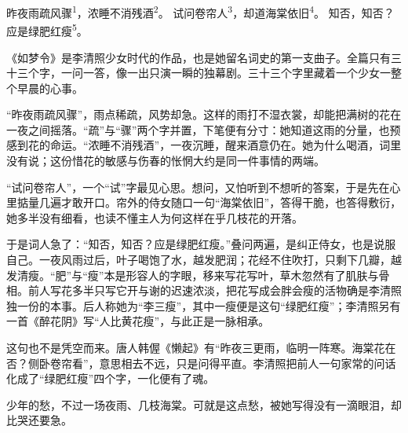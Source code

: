 
\begin{poem}
昨夜雨疏风骤\textsuperscript{1}，浓睡不消残酒\textsuperscript{2}。
试问卷帘人\textsuperscript{3}，却道海棠依旧\textsuperscript{4}。
知否，知否？应是绿肥红瘦\textsuperscript{5}。
\end{poem}

\begin{annotations}
\end{annotations}

\begin{appreciation}
《如梦令》是李清照少女时代的作品，也是她留名词史的第一支曲子。全篇只有三十三个字，一问一答，像一出只演一瞬的独幕剧。三十三个字里藏着一个少女一整个早晨的心事。

“昨夜雨疏风骤”，雨点稀疏，风势却急。这样的雨打不湿衣裳，却能把满树的花在一夜之间摇落。“疏”与“骤”两个字并置，下笔便有分寸：她知道这雨的分量，也预感到花的命运。“浓睡不消残酒”，一夜沉睡，醒来酒意仍在。她为什么喝酒，词里没有说；这份惜花的敏感与伤春的怅惘大约是同一件事情的两端。

“试问卷帘人”，一个“试”字最见心思。想问，又怕听到不想听的答案，于是先在心里掂量几遍才敢开口。帘外的侍女随口一句“海棠依旧”，答得干脆，也答得敷衍，她多半没有细看，也读不懂主人为何这样在乎几枝花的开落。

于是词人急了：“知否，知否？应是绿肥红瘦。”叠问两遍，是纠正侍女，也是说服自己。一夜风雨过后，叶子喝饱了水，越发肥润；花经不住吹打，只剩下几瓣，越发清瘦。“肥”与“瘦”本是形容人的字眼，移来写花写叶，草木忽然有了肌肤与骨相。前人写花多半只写它开与谢的迟速浓淡，把花写成会胖会瘦的活物确是李清照独一份的本事。后人称她为“李三瘦”，其中一瘦便是这句“绿肥红瘦”；李清照另有一首《醉花阴》写“人比黄花瘦”，与此正是一脉相承。

这句也不是凭空而来。唐人韩偓《懒起》有“昨夜三更雨，临明一阵寒。海棠花在否？侧卧卷帘看”，意思相去不远，只是问得平直。李清照把前人一句家常的问话化成了“绿肥红瘦”四个字，一化便有了魂。

少年的愁，不过一场夜雨、几枝海棠。可就是这点愁，被她写得没有一滴眼泪，却比哭还要急。
\end{appreciation}
